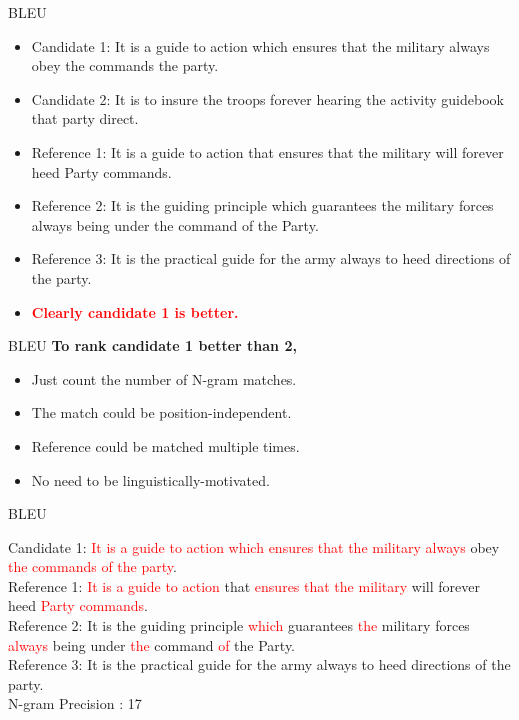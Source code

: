 ﻿\documentclass[table,aspectratio=43,mathserif,xcolor={usenames,dvipsnames,svgnames,table},10pt]{beamer}
\begin{document}
\begin{frame}{BLEU}

\begin{itemize}
\item Candidate 1: It is a guide to action which ensures that the military always obey the commands the party.
\item Candidate 2: It is to insure the troops forever hearing the activity guidebook that party direct.

\item<+-> Reference 1: It is a guide to action that ensures that the military will forever heed Party commands. 
\item<+-> Reference 2: It is the guiding principle which guarantees the military forces always being under the command of the Party.
\item<+-> Reference 3: It is the practical guide for the army always to heed directions of the party.

\item<+-> \textbf{ \textcolor{red}{Clearly candidate 1 is better.}}
\end{itemize}
\end{frame}

\begin{frame}{BLEU}
\textbf{To rank candidate 1 better than 2,}
\begin{itemize}
\item<+-> Just count the number of N-gram matches.
\item<+-> The match could be position-independent.
\item<+-> Reference could be matched multiple times.
\item<+-> No need to be linguistically-motivated.
\end{itemize}
\end{frame}

\begin{frame}{BLEU}

Candidate 1: \textcolor{red} {It is a guide to action which ensures that the military always} obey  \textcolor{red} {the commands of the party}.
\\
Reference 1: \textcolor{red} {It is a guide to action} that \textcolor{red} {ensures that the military} will forever heed \textcolor{red} {Party commands}. 
\\
Reference 2: It is the guiding principle \textcolor{red} {which} guarantees \textcolor{red} {the} military forces \textcolor{red} {always} being under \textcolor{red} {the} command \textcolor{red} {of} the Party.
\\
Reference 3: It is the practical guide for the army always to heed directions of the party.
\\
N-gram Precision : 17
\end{frame}
\end{document}
